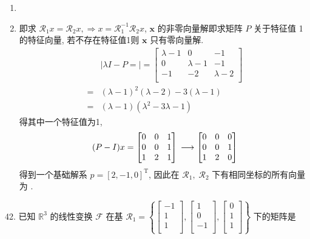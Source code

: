 \begin{enumerate}[(1)]
    \item {}
    
    \item 即求 $\mathscr{R}_1x=\mathscr{R}_2x,\Longrightarrow x= \mathscr{R}_1^{-1}\mathscr{R}_2x$, $\textbf{x}$ 的非零向量解即求矩阵 $P$ 关于特征值 1的特征向量, 若不存在特征值1则 $\textbf{x}$ 只有零向量解.  
    $$
    \begin{aligned}
        &|\lambda I-P=|=\begin{bmatrix}
        \lambda-1&0&-1\\
        0&\lambda-1&-1\\
        -1&-2&\lambda-2\\
        \end{bmatrix}\\
        =&(\lambda-1)^2
        (\lambda-2)-3(\lambda-1)\\
        =&(\lambda-1)(\lambda^2-3\lambda-1)
    \end{aligned}
    $$
    得其中一个特征值为1, 
    $$
    (P-I)x=\begin{bmatrix}
        0&0&1\\
        0&0&1\\
        1&2&1\\
    \end{bmatrix}\\
    \longrightarrow\begin{bmatrix}
        0&0&0\\0&0&1\\1&2&0
    \end{bmatrix}
    $$
    得到一个基础解系 $p=[2,-1,0]^{\text{T}}$, 
    因此在 $\mathscr{R}_1,\;\mathscr{R}_2$ 下有相同坐标的所有向量为 .

\end{enumerate}



\vspace{12pt}

42. 已知 $\mathbb{R}^3$ 的线性变换 $\mathscr{F}$ 在基 $\mathscr{R}_1=\left\{
    \begin{bmatrix}
        -1\\1\\1\\
    \end{bmatrix},
    \begin{bmatrix}
        1\\0\\-1\\
    \end{bmatrix},
    \begin{bmatrix}
        0\\1\\1\\
    \end{bmatrix}
\right\}$ 下的矩阵是

